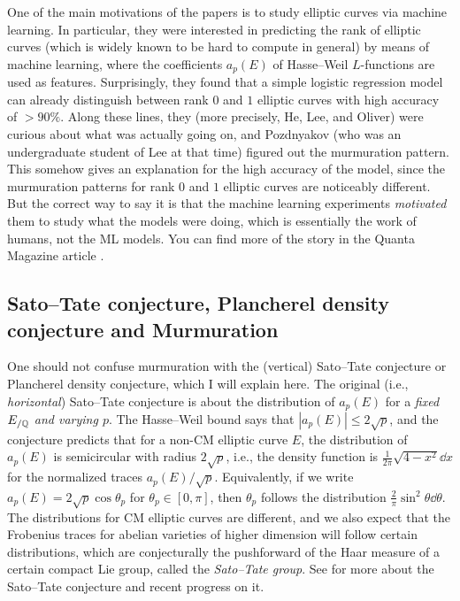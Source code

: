 One of the main motivations of the papers \cite{he2023machine,he2024murmurations} is to study elliptic curves via machine learning.
In particular, they were interested in predicting the rank of elliptic curves (which is widely known to be hard to compute in general) by means of machine learning, where the coefficients $a_p(E)$ of Hasse--Weil $L$-functions are used as features.
Surprisingly, they found that a simple logistic regression model can already distinguish between rank $0$ and $1$ elliptic curves with high accuracy of $>90\%$.
Along these lines, they (more precisely, He, Lee, and Oliver) were curious about what was actually going on, and Pozdnyakov (who was an undergraduate student of Lee at that time) figured out the murmuration pattern.
This somehow gives an explanation for the high accuracy of the model, since the murmuration patterns for rank $0$ and $1$ elliptic curves are noticeably different.
But the correct way to say it is that the machine learning experiments \emph{motivated} them to study what the models were doing, which is essentially the work of humans, not the ML models.
You can find more of the story in the Quanta Magazine article \cite{chiou2024elliptic}.


\subsection{Sato--Tate conjecture, Plancherel density conjecture and Murmuration}


One should not confuse murmuration with the (vertical) Sato--Tate conjecture or Plancherel density conjecture, which I will explain here.
The original (i.e., \emph{horizontal}) Sato--Tate conjecture is about the distribution of $a_p(E)$ for a \emph{fixed $E_{/\mathbb{Q}}$ and varying $p$}.
The Hasse--Weil bound says that $|a_p(E)| \le 2 \sqrt{p}$, and the conjecture predicts that for a non-CM elliptic curve $E$, the distribution of $a_p(E)$ is semicircular with radius $2\sqrt{p}$, i.e., the density function is $\frac{1}{2\pi}\sqrt{4 - x^2} \dd x$ for the normalized traces $a_p(E)/\sqrt{p}$.
Equivalently, if we write $a_p(E) = 2 \sqrt{p} \cos \theta_p$ for $\theta_p \in [0, \pi]$, then $\theta_p$ follows the distribution $\frac{2}{\pi} \sin^2 \theta \dd \theta$.
The distributions for CM elliptic curves are different, and we also expect that the Frobenius traces for abelian varieties of higher dimension will follow certain distributions, which are conjecturally the pushforward of the Haar measure of a certain compact Lie group, called the \emph{Sato--Tate group}.
See \cite{sutherland2019sato} for more about the Sato--Tate conjecture and recent progress on it.


